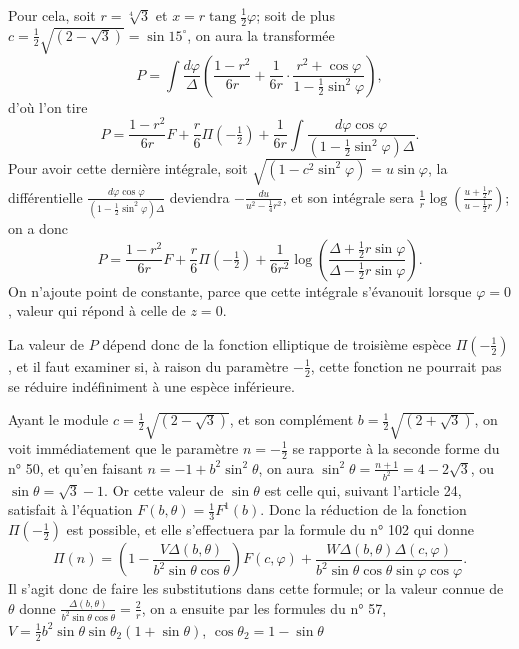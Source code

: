 \documentclass{article}
\begin{document}
Pour cela, soit $r=\sqrt[4]{3}$ et $x=r\operatorname{tang}\frac{1}{2}\varphi$; soit de plus $c=\frac{1}{2}\sqrt{(2-\sqrt{3})}=\sin 15^{\circ}$, on aura la transformée
\[ P=\int\frac{d\varphi}{\Delta}\left(\frac{1-r^{2}}{6r}+\frac{1}{6r}\cdot\frac{r^{2}+\cos\varphi}{1-\tfrac{1}{2}\sin^{2}\varphi}\right), \]
d'où l'on tire
\[ P=\frac{1-r^{2}}{6r}F+\frac{r}{6}\Pi(-\tfrac{1}{2})+\frac{1}{6r}\int\frac{d\varphi\cos\varphi}{(1-\tfrac{1}{2}\sin^{2}\varphi)\Delta}. \]
Pour avoir cette dernière intégrale, soit $\sqrt{(1-c^{2}\sin^{2}\varphi)}=u\sin\varphi$, la différentielle $\frac{d\varphi\cos\varphi}{(1-\frac{1}{2}\sin^{2}\varphi)\Delta}$ deviendra $-\frac{du}{u^{2}-\frac{1}{4}r^{2}}$, et son intégrale sera $\frac{1}{r}\log\left(\frac{u+\frac{1}{2}r}{u-\frac{1}{2}r}\right)$; on a donc
\[ P=\frac{1-r^{2}}{6r}F+\frac{r}{6}\Pi(-\tfrac{1}{2})+\frac{1}{6r^{2}}\log\left(\frac{\Delta+\frac{1}{2}r\sin\varphi}{\Delta-\frac{1}{2}r\sin\varphi}\right). \]
On n'ajoute point de constante, parce que cette intégrale s'évanouit lorsque $\varphi=0$, valeur qui répond à celle de $z=0$.

La valeur de $P$ dépend donc de la fonction elliptique de troisième espèce $\Pi(-\frac{1}{2})$, et il faut examiner si, à raison du paramètre $-\frac{1}{2}$, cette fonction ne pourrait pas se réduire indéfiniment à une espèce inférieure.

Ayant le module $c=\frac{1}{2}\sqrt{(2-\sqrt{3})}$, et son complément $b=\frac{1}{2}\sqrt{(2+\sqrt{3})}$, on voit immédiatement que le paramètre $n=-\frac{1}{2}$ se rapporte à la seconde forme du n° 50, et qu'en faisant $n=-1+b^{2}\sin^{2}\theta$, on aura $\sin^{2}\theta=\frac{n+1}{b^{2}}=4-2\sqrt{3}$, ou $\sin\theta=\sqrt{3}-1$. Or cette valeur de $\sin\theta$ est celle qui, suivant l'article 24, satisfait à l'équation $F(b,\theta)=\frac{1}{3}F^{1}(b)$. Donc la réduction de la fonction $\Pi(-\frac{1}{2})$ est possible, et elle s'effectuera par la formule du n° 102 qui donne
\[ \Pi(n)=\left(1-\frac{V\Delta(b,\theta)}{b^{2}\sin\theta\cos\theta}\right)F(c,\varphi)+\frac{W\Delta(b,\theta)\Delta(c,\varphi)}{b^{2}\sin\theta\cos\theta\sin\varphi\cos\varphi}. \]
Il s'agit donc de faire les substitutions dans cette formule; or la valeur connue de $\theta$ donne $\frac{\Delta(b,\theta)}{b^{2}\sin\theta\cos\theta}=\frac{2}{r}$, on a ensuite par les formules du n° 57, $V=\frac{1}{2}b^{2}\sin\theta\sin\theta_{2}(1+\sin\theta)$, $\cos\theta_{2}=1-\sin\theta$
\end{document}
